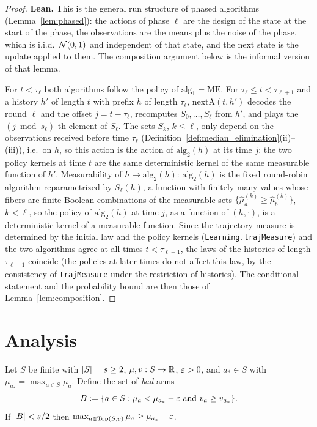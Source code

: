 \begin{proof}
\leanok
{}
\textbf{Lean.} This is the general run structure of phased algorithms (Lemma~\ref{lem:phased}):
the actions of phase $\ell$ are the design of the state at the start of the phase, the
observations are the means plus the noise of the phase, which is i.i.d.\ $\mathcal{N}(0,1)$ and
independent of that state, and the next state is the update applied to them. The composition
argument below is the informal version of that lemma.

For $t<\tau_\ell$ both algorithms follow the policy of $\mathrm{alg}_1 = \mathrm{ME}$. For
$\tau_\ell\le t<\tau_{\ell+1}$ and a history $h'$ of length $t$ with prefix $h$ of length
$\tau_\ell$, $\mathrm{nextA}(t,h')$ decodes the round $\ell$ and the offset $j = t-\tau_\ell$,
recomputes $S_0,\dots,S_\ell$ from $h'$, and plays the $(j\bmod s_\ell)$-th element of
$S_\ell$. The sets $S_k$, $k\le\ell$, only depend on the observations received before time
$\tau_\ell$ (Definition~\ref{def:median_elimination}(ii)--(iii)), i.e.\ on $h$, so this action is
the action of $\mathrm{alg}_2(h)$ at its time $j$: the two policy kernels at time $t$ are the
same deterministic kernel of the same measurable function of $h'$. Measurability of
$h\mapsto\mathrm{alg}_2(h)$: $\mathrm{alg}_2(h)$ is the fixed round-robin algorithm
reparametrized by $S_\ell(h)$, a function with finitely many values whose fibers are finite
Boolean combinations of the measurable sets $\{\hat\mu^{(k)}_a\ge\hat\mu^{(k)}_b\}$, $k<\ell$,
so the policy of $\mathrm{alg}_2(h)$ at time $j$, as a function of $(h,\cdot)$, is a
deterministic kernel of a measurable function. Since the trajectory measure is determined by
the initial law and the policy kernels (\texttt{Learning.trajMeasure}) and the two algorithms
agree at all times $t<\tau_{\ell+1}$, the laws of the histories of length $\tau_{\ell+1}$
coincide (the policies at later times do not affect this law, by the consistency of
\texttt{trajMeasure} under the restriction of histories). The conditional statement and the
probability bound are then those of Lemma~\ref{lem:composition}.
\end{proof}

\section{Analysis}
\label{sec:pre_median_analysis}

\begin{lemma}\label{lem:pm_selection}
\leanok
{}
Let $S$ be finite with $\lvert S \rvert = s\ge2$, $\mu,v : S\to\mathbb{R}$, $\varepsilon>0$, and $a_*\in S$ with
$\mu_{a_*} = \max_{a\in S}\mu_a$. Define the set of \emph{bad} arms
\[
  B := \{a\in S : \mu_a < \mu_{a_*}-\varepsilon \text{ and } v_a\ge v_{a_*}\}.
\]
If $\lvert B \rvert < s/2$ then $\max_{a\in\mathrm{Top}(S,v)}\mu_a\ge\mu_{a_*}-\varepsilon$.
\end{lemma}

